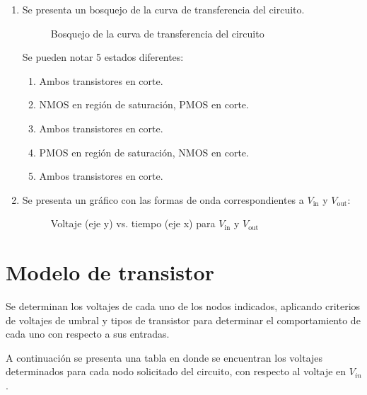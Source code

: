 \documentclass[letterpaper, 12pt]{article}
\numberwithin{equation}{section}
\begin{document}
\begin{enumerate}[label=\Alph*.]

  \item Se presenta un bosquejo de la curva de transferencia del circuito.

    \begin{figure}[H]
      \centering
      
      \caption{Bosquejo de la curva de transferencia del circuito}
    \end{figure}

Se pueden notar 5 estados diferentes:

\begin{enumerate}[label=\protect\Circled{\arabic*}]

  \item Ambos transistores en corte.

  \item NMOS en región de saturación, PMOS en corte.

  \item Ambos transistores en corte.

  \item PMOS en región de saturación, NMOS en corte.

  \item Ambos transistores en corte.

\end{enumerate}

\item Se presenta un gráfico con las formas de onda correspondientes a \(V_{\text{in}}\) y \(V_{\text{out}}\):

    \begin{figure}[H]
      \centering
      
      \caption{Voltaje (eje y) vs. tiempo (eje x) para \(V_{\text{in}}\) y \(V_{\text{out}}\)}
    \end{figure}

\end{enumerate}

\section{Modelo de transistor}

Se determinan los voltajes de cada uno de los nodos indicados, aplicando criterios de voltajes de umbral y tipos de transistor para determinar el comportamiento de cada uno con respecto a sus entradas.

A continuación se presenta una tabla en donde se encuentran los voltajes determinados para cada nodo solicitado del circuito, con respecto al voltaje en \(V_{in}\).
\end{document}
